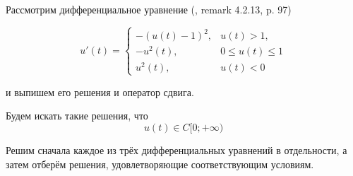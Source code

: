 Рассмотрим дифференциальное уравнение (\cite{Vorotnikov}, remark 4.2.13, p. 97)

\begin{equation}\label{primer_iz_statyi}
	u'(t)=
	\left\{
		\begin{array}{ll}
			-(u(t)-1)^2, & u(t) > 1, \\
			-u^2 (t)   , & 0 \leq u(t) \leq 1 \\
			u^2 (t)    , & u(t) < 0
		\end{array}
	\right.
\end{equation}

и выпишем его решения и оператор сдвига.

Будем искать такие решения, что
\begin{equation}
	u(t) \in C[0; +\infty)
\end{equation}

Решим сначала каждое из трёх дифференциальных уравнений в отдельности, а затем отберём решения,
удовлетворяющие соответствующим условиям.

